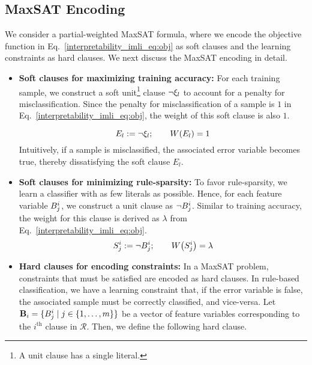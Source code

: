 \subsection{MaxSAT Encoding}
\label{interpretability_imli_sec:encoding}
We consider a partial-weighted MaxSAT formula, where we encode the objective function in Eq.~\eqref{interpretability_imli_eq:obj} as soft clauses and the learning constraints as hard clauses. We next discuss the MaxSAT encoding in detail.

\begin{itemize}
	\item \textbf{Soft clauses for maximizing training accuracy:} For each training sample, we construct a soft unit\footnote{A unit clause has a single literal.} clause $ \neg \xi_l $ to account for a penalty for misclassification. Since the penalty for misclassification of a sample is $ 1 $  in Eq.~\eqref{interpretability_imli_eq:obj},  the weight of this soft clause is also $ 1 $. 
	
	\begin{equation}
		\label{interpretability_imli_soft_clause_error}
		E_l:=\neg \xi_l;  \qquad W \! \left( E_l \right)= 1
	\end{equation}
	Intuitively, if a sample is misclassified, the associated error variable becomes true, thereby dissatisfying the soft clause $ E_l $.
	 
	
	\item \textbf{Soft clauses for minimizing rule-sparsity:} To favor rule-sparsity, we learn a classifier with as few literals as possible. Hence, for each feature variable $ B_j^i $, we construct a unit clause as $ \neg B_j^i $. Similar to training accuracy, the weight for this clause is derived as $ \lambda $ from Eq.~\eqref{interpretability_imli_eq:obj}.
	\begin{equation}
		\label{interpretability_imli_soft_clause_feature}
		S_j^i:= \neg B_j^i; \qquad W \! \left( S_j^i \right)= \lambda
	\end{equation}
	

	
	\item \textbf{Hard clauses for encoding constraints:} In a MaxSAT problem, constraints that must be satisfied are encoded as hard clauses. In rule-based classification, we have a learning constraint that, if the error variable is false, the associated sample must be correctly classified, and vice-versa. Let  $\mathbf{B}_i= \{B^i_{j} \mid j \in \{1,\dots,m \}\}$ be a vector of feature variables corresponding to the $ i^\text{th} $  clause in $ \mathcal{R} $. Then, we define the following hard clause.
	

\end{itemize}
